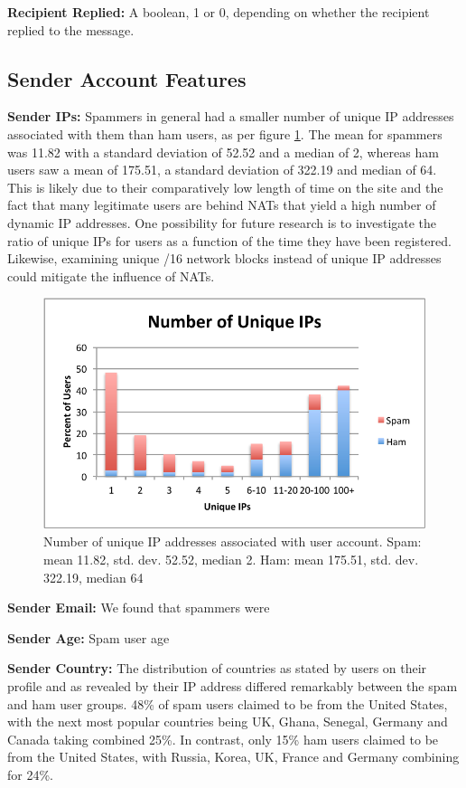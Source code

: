 \documentclass[preprint]{acm_proc_article-sp}
\begin{document}
\textbf{Recipient Replied:} A boolean, 1 or 0, depending on whether the recipient replied to the message.

\subsection{Sender Account Features}

\textbf{Sender IPs:} Spammers in general had a smaller number of unique IP addresses associated with them than ham users, as per figure \ref{fig:uniqip}. The mean for spammers was 11.82 with a standard deviation of 52.52 and a median of 2, whereas ham users saw a mean of 175.51, a standard deviation of 322.19 and median of 64. This is likely due to their comparatively low length of time on the site and the fact that many legitimate users are behind NATs that yield a high number of dynamic IP addresses. One possibility for future research is to investigate the ratio of unique IPs for users as a function of the time they have been registered. Likewise, examining unique /16 network blocks instead of unique IP addresses could mitigate the influence of NATs.

\begin{figure}[h]
    \centering
    \includegraphics[width=\linewidth]{figures/unique-ips.pdf}
    \caption{Number of unique IP addresses associated with user account. Spam: mean 11.82, std. dev. 52.52, median 2. Ham: mean 175.51, std. dev. 322.19, median 64}
    \label{fig:uniqip}
\end{figure}

\textbf{Sender Email:} We found that spammers were 

\textbf{Sender Age:} Spam user age 

\textbf{Sender Country:} The distribution of countries as stated by users on their profile and as revealed by their IP address differed remarkably between the spam and ham user groups. 48\% of spam users claimed to be from the United States, with the next most popular countries being UK, Ghana, Senegal, Germany and Canada taking combined 25\%. In contrast, only 15\% ham users claimed to be from the United States, with Russia, Korea, UK, France and Germany combining for 24\%. 
\end{document}
